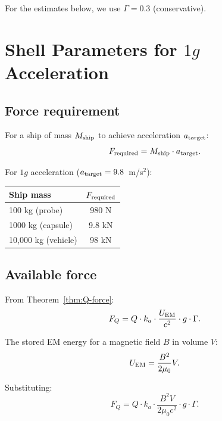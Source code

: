 \documentclass[aps,prd,twocolumn,superscriptaddress,nofootinbib]{revtex4-2}
\newcommand{\ka}{k_a}
\begin{document}
For the estimates below, we use $\Gamma = 0.3$ (conservative).

\section{Shell Parameters for $1g$ Acceleration}\label{sec:parameters}

\subsection{Force requirement}

For a ship of mass $M_{\rm ship}$ to achieve acceleration $a_{\rm target}$:
\begin{equation}
F_{\rm required} = M_{\rm ship} \cdot a_{\rm target}.
\end{equation}

For $1g$ acceleration ($a_{\rm target} = 9.8$~m/s$^2$):
\begin{center}
\begin{tabular}{lc}
\toprule
Ship mass & $F_{\rm required}$ \\
\midrule
100 kg (probe) & 980 N \\
1000 kg (capsule) & 9.8 kN \\
10,000 kg (vehicle) & 98 kN \\
\bottomrule
\end{tabular}
\end{center}

\subsection{Available force}

From Theorem~\ref{thm:Q-force}:
\begin{equation}
F_Q = Q \cdot \ka \cdot \frac{U_{\rm EM}}{c^2} \cdot g \cdot \Gamma.
\end{equation}

The stored EM energy for a magnetic field $B$ in volume $V$:
\begin{equation}
U_{\rm EM} = \frac{B^2}{2\mu_0} V.
\end{equation}

Substituting:
\begin{equation}
F_Q = Q \cdot \ka \cdot \frac{B^2 V}{2\mu_0 c^2} \cdot g \cdot \Gamma.
\label{eq:F-design}
\end{equation}
\end{document}
